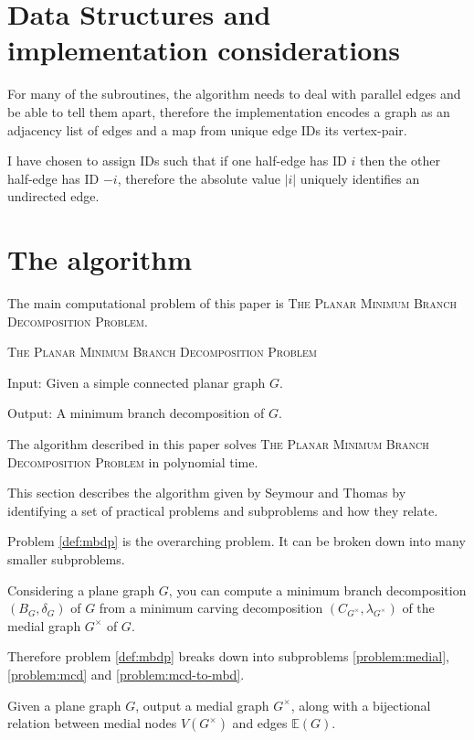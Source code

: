 \documentclass{article}
\begin{document}
\section{Data Structures and implementation considerations}

	For many of the subroutines, the algorithm needs to deal with parallel edges and be able to tell them apart, therefore the implementation encodes a graph as an adjacency list of edges and a map from unique edge IDs its vertex-pair.

	I have chosen to assign IDs such that if one half-edge has ID $i$ then the other half-edge has ID $-i$, therefore the absolute value $|i|$ uniquely identifies an undirected edge.


\section{The algorithm}

	The main computational problem of this paper is \textsc{The Planar Minimum Branch Decomposition Problem}.

	\begin{definition}\label{def:mbdp}
		\textsc{The Planar Minimum Branch Decomposition Problem}

		Input: Given a simple connected planar graph $G$.

		Output: A minimum branch decomposition of $G$.
	\end{definition}

	The algorithm described in this paper solves \textsc{The Planar Minimum Branch Decomposition Problem} in polynomial time.

	This section describes the algorithm given by Seymour and Thomas\cite{ST93} by identifying a set of practical problems and subproblems and how they relate.
	
	Problem \ref{def:mbdp} is the overarching problem. It can be broken down into many smaller subproblems.

	Considering a plane graph $G$, you can compute a minimum branch decomposition $(B_G, \delta_G)$ of $G$ from a minimum carving decomposition $(C_{G^\times}, \lambda_{G^\times})$ of the medial graph $G^\times$ of $G$.

	Therefore problem \ref{def:mbdp} breaks down into subproblems \ref{problem:medial}, \ref{problem:mcd} and \ref{problem:mcd-to-mbd}.

	\begin{problem}\label{problem:medial}
		Given a plane graph $G$, output a medial graph $G^\times$, along with a bijectional relation between medial nodes $V(G^\times)$ and edges $\mathbb{E}(G)$.
	\end{problem}
\end{document}
